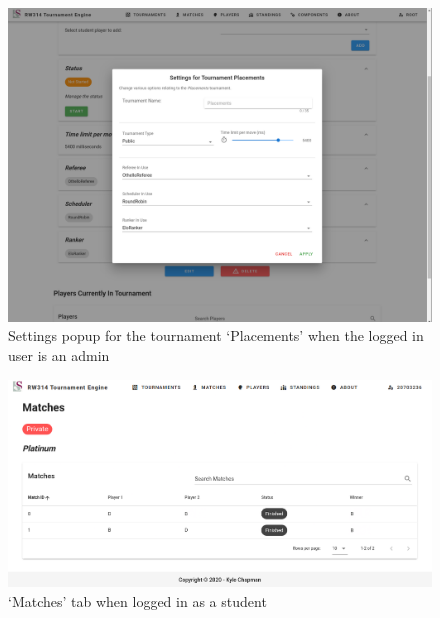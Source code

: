 \documentclass[a4paper, 11pt]{report}
\begin{document}
\begin{figure}[H]
	\centering
	\includegraphics[scale=0.33]{settings-admin.png}
	\caption{Settings popup for the tournament `Placements' when the logged in user is an admin}
	\label{fig:settings-admin}
\end{figure}
\begin{figure}[H]
	\centering
	\includegraphics[scale=0.38]{matches-student.png}
	\caption{`Matches' tab when logged in as a student}
	\label{fig:matches-student}
\end{figure}
\end{document}
